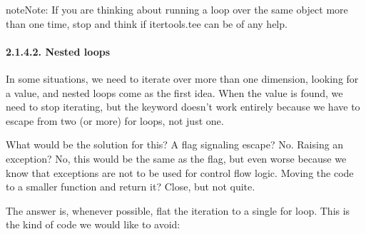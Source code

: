 \documentclass[a4paper,10pt,english]{sphinxmanual}
\begin{document}
\begin{sphinxadmonition}{note}{Note:}
If you are thinking about running a loop over the same object more than
one time, stop and think if itertools.tee can be of any help.
\end{sphinxadmonition}


\paragraph{2.1.4.2. Nested loops}
\label{\detokenize{chapters/7_generators/index:nested-loops}}
In some situations, we need to iterate over more than one dimension, looking for a value,
and nested loops come as the first idea. When the value is found, we need to stop iterating,
but the  keyword doesn’t work entirely because we have to escape from two (or
more) for loops, not just one.

What would be the solution for this? A flag signaling escape? No. Raising an exception?
No, this would be the same as the flag, but even worse because we know that exceptions
are not to be used for control flow logic. Moving the code to a smaller function and return
it? Close, but not quite.

The answer is, whenever possible, flat the iteration to a single for loop.
This is the kind of code we would like to avoid:

\begin{sphinxVerbatim}[commandchars=\\\{\}]
  
      
        
            
               
                   
            

       
         

    \PYG{l+s+s2}{ found at [}\PYG{l+s+s2}{]}  
     
\end{sphinxVerbatim}
\end{document}
